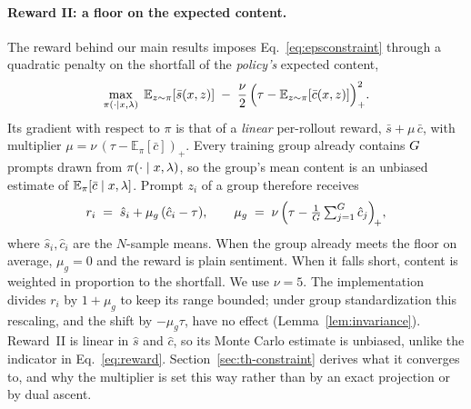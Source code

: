 \paragraph{Reward II: a floor on the expected content.}
The reward behind our main results imposes Eq.~\eqref{eq:epsconstraint}
through a quadratic penalty on the shortfall of the \emph{policy's} expected
content,
\begin{equation}
  \max_{\pi(\cdot\mid x,\lambda)}\;
  \mathbb{E}_{z\sim\pi}[\bar s(x,z)]
  \;-\; \frac{\nu}{2}\,\Bigl(\tau - \mathbb{E}_{z\sim\pi}[\bar c(x,z)]\Bigr)_+^{2}.
  \label{eq:penalty}
\end{equation}
Its gradient with respect to $\pi$ is that of a \emph{linear} per-rollout
reward, $\bar s + \mu\,\bar c$, with multiplier
$\mu = \nu\,(\tau - \mathbb{E}_\pi[\bar c])_+$. Every training group already
contains $G$ prompts drawn from $\pi(\cdot\mid x,\lambda)$, so the group's
mean content is an unbiased estimate of $\mathbb{E}_\pi[\bar c \mid x,\lambda]$.
Prompt $z_i$ of a group therefore receives
\begin{equation}
  r_i \;=\; \hat s_i + \mu_g\,(\hat c_i - \tau),
  \qquad
  \mu_g \;=\; \nu\,\Bigl(\tau - \tfrac{1}{G}\textstyle\sum_{j=1}^{G} \hat c_j\Bigr)_{\!+},
  \label{eq:reward-exp}
\end{equation}
where $\hat s_i, \hat c_i$ are the $N$-sample means. When the group already
meets the floor on average, $\mu_g = 0$ and the reward is plain sentiment. When
it falls short, content is weighted in proportion to the shortfall. We use
$\nu = 5$. The implementation divides $r_i$ by $1+\mu_g$ to keep its range
bounded; under group standardization this rescaling, and the shift by
$-\mu_g\tau$, have no effect (Lemma~\ref{lem:invariance}). Reward~II is linear in
$\hat s$ and $\hat c$, so its Monte Carlo estimate is unbiased, unlike the
indicator in Eq.~\eqref{eq:reward}. Section~\ref{sec:th-constraint} derives what
it converges to, and why the multiplier is set this way rather than by an exact
projection or by dual ascent.

